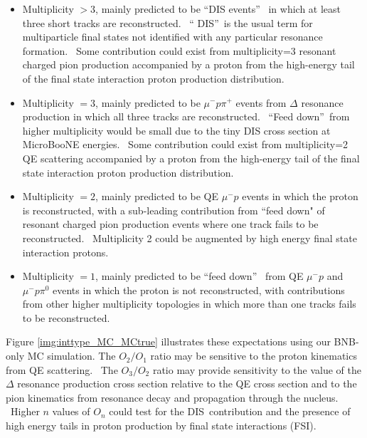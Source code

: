 \documentclass{article}
\begin{document}
\begin{itemize}
\item Multiplicity $>3$, mainly predicted to be \textquotedblleft DIS events\textquotedblright%
\ in which at least three short tracks are reconstructed. \ \textquotedblleft
DIS\textquotedblright\ is the usual term for multiparticle final states not
identified with any particular resonance formation. \ Some contribution could
exist from multiplicity=3 resonant charged pion production accompanied by a proton from the high-energy tail of the final state interaction proton production distribution.

\item Multiplicity $=3$, mainly predicted to be $\mu^{-}p\pi^{+}$ events from $\Delta$
resonance production in which all three tracks are reconstructed.
\ \textquotedblleft Feed down\textquotedblright\ from higher multiplicity
would be small due to the tiny DIS cross section at MicroBooNE energies.
\ Some contribution could exist from multiplicity=2 QE scattering accompanied
by a proton from the high-energy tail of the final state interaction proton production distribution.

\item Multiplicity $=2$, mainly predicted to be QE $\mu^{-}p$ events in which the proton is
reconstructed, with a sub-leading contribution from ``feed down" of resonant
charged pion production events where one track fails to be reconstructed.
\ Multiplicity 2 could be augmented by high energy final state interaction protons.

\item Multiplicity $=1$, mainly predicted to be \textquotedblleft feed down\textquotedblright%
\ from QE $\mu^{-}p$ and $\mu^{-}p\pi^{0}$ events in which the proton is not
reconstructed, with contributions from other higher multiplicity topologies in
which more than one tracks fails to be reconstructed.
\end{itemize}

Figure \ref{img:inttype_MC_MCtrue} illustrates these expectations using our BNB-only MC simulation.
The $O_{2}/O_{1}$ ratio may be sensitive to the proton kinematics from QE
scattering. \ The $O_{3}/O_{2}$ ratio may provide sensitivity to the
value of the $\Delta$ resonance production cross section relative to the QE
cross section and to the pion kinematics from resonance decay and
propagation through the nucleus. \ Higher $n$ values of $O_{n}$ could test
for the DIS\ contribution and the presence of high energy tails in proton
production by final state interactions (FSI).
\end{document}
